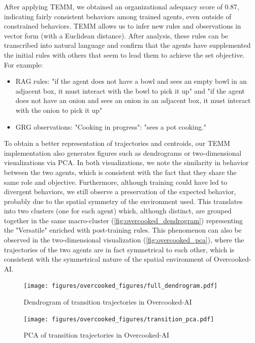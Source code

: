 After applying TEMM, we obtained an organizational adequacy score of 0.87, indicating fairly consistent behaviors among trained agents, even outside of constrained behaviors. TEMM allows us to infer new rules and observations in vector form (with a Euclidean distance). After analysis, these rules can be transcribed into natural language and confirm that the agents have supplemented the initial rules with others that seem to lead them to achieve the set objective. For example:
%
\begin{itemize}
  \item RAG rules: "if the agent does not have a bowl and sees an empty bowl in an adjacent box, it must interact with the bowl to pick it up" and "if the agent does not have an onion and sees an onion in an adjacent box, it must interact with the onion to pick it up"
  \item GRG observations: "Cooking in progress": "sees a pot cooking."
\end{itemize}

To obtain a better representation of trajectories and centroids, our TEMM implementation also generates figures such as dendrograms or two-dimensional visualizations via PCA. In both visualizations, we note the similarity in behavior between the two agents, which is consistent with the fact that they share the same role and objective. Furthermore, although training could have led to divergent behaviors, we still observe a preservation of the expected behavior, probably due to the spatial symmetry of the environment used. This translates into two clusters (one for each agent) which, although distinct, are grouped together in the same macro-cluster (\autoref{fig:overcooked_dendrogram}) representing the "Versatile" enriched with post-training rules. This phenomenon can also be observed in the two-dimensional visualization (\autoref{fig:overcooked_pca}), where the trajectories of the two agents are in fact symmetrical to each other, which is consistent with the symmetrical nature of the spatial environment of Overcooked-AI.

\begin{figure}[h!]
  \centering
  \texttt{[image: figures/overcooked\_figures/full\_dendrogram.pdf]}
  \caption{Dendrogram of transition trajectories in Overcooked-AI}
  \label{fig:overcooked_dendrogram}
\end{figure}

\begin{figure}[h!]
  \centering
  \texttt{[image: figures/overcooked\_figures/transition\_pca.pdf]}
  \caption{PCA of transition trajectories in Overcooked-AI}
  \label{fig:overcooked_pca}
\end{figure}

